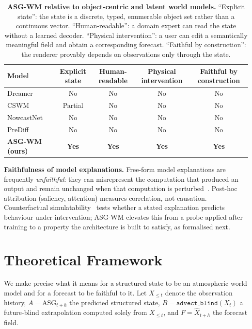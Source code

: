 \documentclass[fleqn,10pt]{wlscirep}
\begin{document}
\begin{table}[ht]
\centering
\caption{\textbf{ASG-WM relative to object-centric and latent world models.}
``Explicit state'': the state is a discrete, typed, enumerable object set rather than a continuous vector.
``Human-readable'': a domain expert can read the state without a learned decoder.
``Physical intervention'': a user can edit a semantically meaningful field and obtain a corresponding forecast.
``Faithful by construction'': the renderer provably depends on observations only through the state.}
\label{tab:wm}
\small
\begin{tabular}{@{}lcccc@{}}
\toprule
Model & Explicit state & Human-readable & Physical intervention & Faithful by construction \\
\midrule
Dreamer~\cite{hafner2023dreamerv3}      & No      & No  & No  & No \\
CSWM~\cite{kipf2020cswm}                & Partial & No  & No  & No \\
NowcastNet~\cite{zhang2023nowcastnet}   & No      & No  & No  & No \\
PreDiff~\cite{gao2023prediff}           & No      & No  & No  & No \\
\textbf{ASG-WM (ours)}                  & \textbf{Yes} & \textbf{Yes} & \textbf{Yes} & \textbf{Yes} \\
\bottomrule
\end{tabular}
\end{table}

\textbf{Faithfulness of model explanations.}
Free-form model explanations are frequently \emph{unfaithful}: they can misrepresent the computation that produced an output and remain unchanged when that computation is perturbed~\cite{turpin2023cot,lanham2023faithfulness,chen2025reasoning}.
Post-hoc attribution (saliency, attention) measures correlation, not causation.
Counterfactual simulatability~\cite{chen2023counterfactual} tests whether a stated explanation predicts behaviour under intervention; ASG-WM elevates this from a probe applied after training to a property the architecture is built to satisfy, as formalised next.

\section*{Theoretical Framework}

We make precise what it means for a structured state to be an atmospheric world model and for a forecast to be faithful to it.
Let $X_{\le t}$ denote the observation history, $A=\text{ASG}_{t+h}$ the predicted structured state, $B=\texttt{advect\_blind}(X_t)$ a future-blind extrapolation computed solely from $X_{\le t}$, and $F=\hat{X}_{t+h}$ the forecast field.
\end{document}
